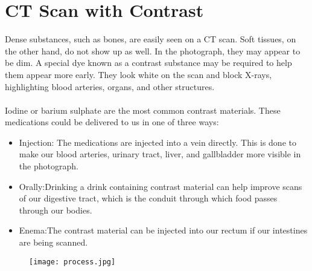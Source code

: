 \documentclass[12pt]{article}
\begin{document}
\section*{ \huge CT Scan with Contrast}

Dense substances, such as bones, are easily seen on a CT scan. Soft tissues, on the other hand, do not show up as well. In the photograph, they may appear to be dim. A special dye known as a contrast substance may be required to help them appear more early. They look white on the scan and block X-rays, highlighting blood arteries, organs, and other structures. 
\\
\\
Iodine or barium sulphate are the most common contrast materials. These medications could be delivered to us in one of three ways:

\begin{itemize}


\item Injection: The medications are injected into a vein directly. This is done to make our blood arteries, urinary tract, liver, and gallbladder more visible in the photograph.

\item Orally:Drinking a drink containing contrast material can help improve scans of our digestive tract, which is the conduit through which food passes through our bodies.

\item Enema:The contrast material can be injected into our rectum if our intestines are being scanned.

\end{itemize}

\begin{figure}[h]
\centering
\texttt{[image: process.jpg]}
\end{figure}
\end{document}
